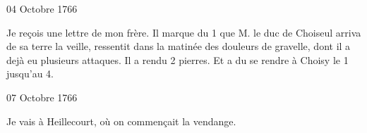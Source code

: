                      \begin{diary}{04 Octobre 1766}{}
                        
                         Je reçois une lettre de mon
                              frère. Il
                           marque du 1
                           que M. le duc de
                              Choiseul arriva de sa terre la veille,
                           ressentit dans la matinée des douleurs
                           de gravelle, dont il a
                           dejà eu plusieurs
                           attaques. Il a rendu 2 pierres. Et a
                           du se rendre à Choisy
                           le 1
                              jusqu’au 4. \bigskip
        
        
                     \end{diary}

                     \begin{diary}{07 Octobre 1766}{}
                        
                         Je vais à Heillecourt, où on commençait
                           la vendange. \bigskip
        
        
                     \end{diary}

